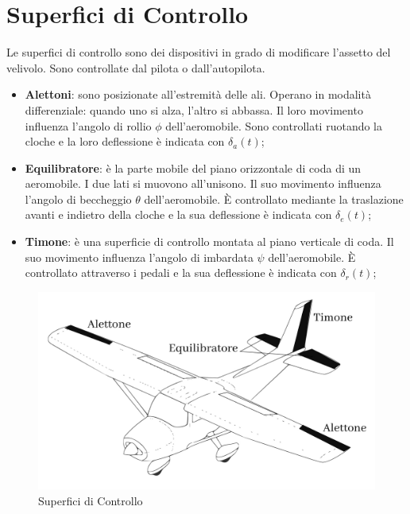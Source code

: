 \section{Superfici di Controllo}
Le superfici di controllo sono dei dispositivi in grado di modificare l'assetto del velivolo. Sono controllate dal pilota o dall'autopilota.

\begin{itemize}
    \item \textbf{Alettoni}: sono posizionate all'estremità delle ali. Operano in modalità differenziale: quando uno si alza, l'altro si abbassa.
          Il loro movimento influenza l'angolo di rollio $\phi$ dell'aeromobile.
          Sono controllati ruotando la cloche e la loro deflessione è indicata con $\delta_a (t)$;
    \item \textbf{Equilibratore}: è la parte mobile del piano orizzontale di coda di un aeromobile. I due lati si muovono all'unisono.
          Il suo movimento influenza l'angolo di beccheggio $\theta$ dell'aeromobile.
          È controllato mediante la traslazione avanti e indietro della cloche e la sua deflessione è indicata con $\delta_e (t)$;

    \item \textbf{Timone}: è una superficie di controllo montata al piano verticale di coda.
          Il suo movimento influenza l'angolo di imbardata $\psi$ dell'aeromobile.
          È controllato attraverso i pedali e la sua deflessione è indicata con $\delta_r (t)$;
\end{itemize}

\begin{figure}[H]
    \centering
    \includegraphics[width=0.55\linewidth]{Immagini/ControlSurfaces.jpg}
    \caption{Superfici di Controllo \cite{smith_aircraft_flight_mechanics}}
\end{figure}
